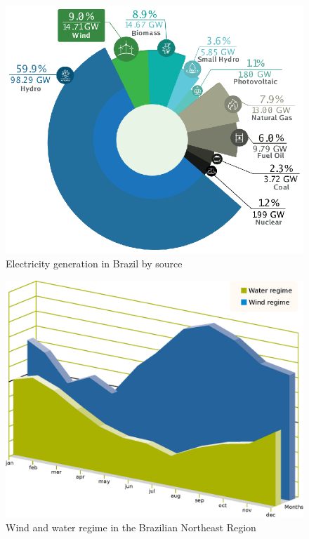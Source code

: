 \begin{figure}[ht]
	\caption{Electricity generation in Brazil by source}
	\begin{center}
		\includegraphics[scale=0.8]{Images/BRshare19.eps}
	\end{center}
	\label{fig: BRshare}
\end{figure}

\begin{figure}[hb]
	\caption{Wind and water regime in the Brazilian Northeast Region}
	\begin{center}
		\includegraphics[scale=0.5]{Images/WindWater.eps}
	\end{center}
	\label{fig: WindWater}
\end{figure}

